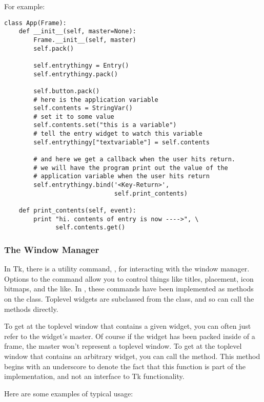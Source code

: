 For example: 
\begin{verbatim}
class App(Frame):
    def __init__(self, master=None):
        Frame.__init__(self, master)
        self.pack()
        
        self.entrythingy = Entry()
        self.entrythingy.pack()
        
        self.button.pack()
        # here is the application variable
        self.contents = StringVar()
        # set it to some value
        self.contents.set("this is a variable")
        # tell the entry widget to watch this variable
        self.entrythingy["textvariable"] = self.contents
        
        # and here we get a callback when the user hits return.
        # we will have the program print out the value of the
        # application variable when the user hits return
        self.entrythingy.bind('<Key-Return>',
                              self.print_contents)

    def print_contents(self, event):
        print "hi. contents of entry is now ---->", \
              self.contents.get()
\end{verbatim}


\subsubsection{The Window Manager} %

In Tk, there is a utility command, , for interacting with the
window manager.  Options to the \code{wm} command allow you to control
things like titles, placement, icon bitmaps, and the like.  In
, these commands have been implemented as methods
on the  class.  Toplevel widgets are subclassed from the
 class, and so can call the \class{Wm} methods directly.


To get at the toplevel window that contains a given widget, you can
often just refer to the widget's master.  Of course if the widget has
been packed inside of a frame, the master won't represent a toplevel
window.  To get at the toplevel window that contains an arbitrary
widget, you can call the \method{_root()} method.  This
method begins with an underscore to denote the fact that this function
is part of the implementation, and not an interface to Tk functionality.

Here are some examples of typical usage:

